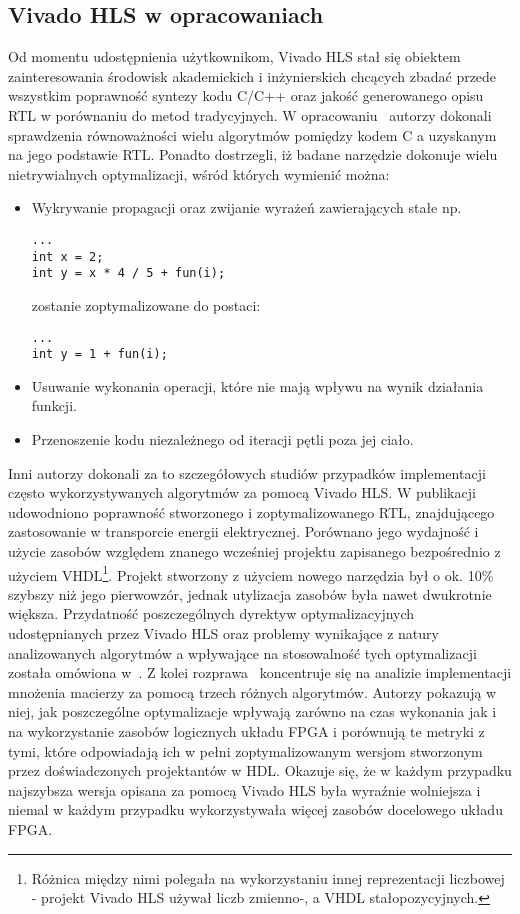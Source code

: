\subsection{Vivado HLS w opracowaniach}
Od momentu udostępnienia użytkownikom, Vivado HLS stał się obiektem zainteresowania środowisk akademickich i inżynierskich chcących zbadać przede wszystkim poprawność syntezy kodu C/C++ oraz jakość generowanego opisu RTL w porównaniu do metod tradycyjnych. W opracowaniu~\cite{C_VERILOG} autorzy dokonali sprawdzenia równoważności wielu algorytmów pomiędzy kodem C a uzyskanym na jego podstawie RTL. Ponadto dostrzegli, iż badane narzędzie dokonuje wielu nietrywialnych optymalizacji, wśród których wymienić można:
\begin{itemize}
\item Wykrywanie propagacji oraz zwijanie wyrażeń zawierających stałe np.  
\begin{lstlisting}
...
int x = 2;
int y = x * 4 / 5 + fun(i);
\end{lstlisting}
zostanie zoptymalizowane do postaci:
\begin{lstlisting}
...
int y = 1 + fun(i);
\end{lstlisting}
\item Usuwanie wykonania operacji, które nie mają wpływu na wynik działania funkcji.
\item Przenoszenie kodu niezależnego od iteracji pętli poza jej ciało.
\end{itemize}
Inni autorzy dokonali za to szczegółowych studiów przypadków implementacji często wykorzystywanych algorytmów za pomocą Vivado HLS. W publikacji~\cite{HLS_HDL_GRID} udowodniono poprawność stworzonego i zoptymalizowanego RTL, znajdującego zastosowanie w transporcie energii elektrycznej. Porównano jego wydajność i użycie zasobów względem znanego wcześniej projektu zapisanego bezpośrednio z użyciem VHDL\footnote{Różnica między nimi polegała na wykorzystaniu innej reprezentacji liczbowej - projekt Vivado HLS używał liczb zmienno-, a VHDL stałopozycyjnych.}. Projekt stworzony z użyciem nowego narzędzia był o ok. 10\% szybszy niż jego pierwowzór, jednak utylizacja zasobów była nawet dwukrotnie większa. Przydatność poszczególnych dyrektyw optymalizacyjnych udostępnianych przez Vivado HLS oraz problemy wynikające z natury analizowanych algorytmów a wpływające na stosowalność tych optymalizacji została omówiona w~\cite{VHLS_ESD}. Z kolei rozprawa~\cite{HLS_HDL_MATRIX} koncentruje się na analizie implementacji mnożenia macierzy za pomocą trzech różnych algorytmów. Autorzy pokazują w niej, jak poszczególne optymalizacje wpływają zarówno na czas wykonania jak i na wykorzystanie zasobów logicznych układu FPGA i porównują te metryki z tymi, które odpowiadają ich w pełni zoptymalizowanym wersjom stworzonym przez doświadczonych projektantów w HDL. Okazuje się, że w każdym przypadku najszybsza wersja opisana za pomocą Vivado HLS była wyraźnie wolniejsza i niemal w każdym przypadku wykorzystywała więcej zasobów docelowego układu FPGA.


